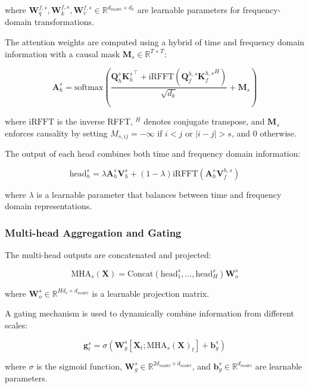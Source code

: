 where $\mathbf{W}_q^{f,s}, \mathbf{W}_k^{f,s}, \mathbf{W}_v^{f,s} \in \mathbb{R}^{d_{model} \times d_k}$ are learnable parameters for frequency-domain transformations.

The attention weights are computed using a hybrid of time and frequency domain information with a causal mask $\mathbf{M}_s \in \mathbb{R}^{T \times T}$:

\begin{equation}
    \mathbf{A}_h^s = \text{softmax}\left(\frac{\mathbf{Q}_h^s{\mathbf{K}_h^s}^\top + \text{iRFFT}(\mathbf{Q}_f^{h,s}{\mathbf{K}_f^{h,s}}^H)}{\sqrt{d_k}} + \mathbf{M}_s\right)
\end{equation}

where $\text{iRFFT}$ is the inverse RFFT, $^H$ denotes conjugate transpose, and $\mathbf{M}_s$ enforces causality by setting $M_{s,ij} = -\infty$ if $i < j$ or $|i-j| > s$, and 0 otherwise.

The output of each head combines both time and frequency domain information:

\begin{equation}
    \text{head}_h^s = \lambda \mathbf{A}_h^s\mathbf{V}_h^s + (1-\lambda)\text{iRFFT}(\mathbf{A}_h^s\mathbf{V}_f^{h,s})
\end{equation}

where $\lambda$ is a learnable parameter that balances between time and frequency domain representations.

\subsubsection{Multi-head Aggregation and Gating}
The multi-head outputs are concatenated and projected:

\begin{equation}
    \text{MHA}_s(\mathbf{X}) = \text{Concat}(\text{head}_1^s, ..., \text{head}_H^s)\mathbf{W}_o^s
\end{equation}

where $\mathbf{W}_o^s \in \mathbb{R}^{Hd_v \times d_{model}}$ is a learnable projection matrix.

A gating mechanism is used to dynamically combine information from different scales:

\begin{equation}
    \mathbf{g}_t^s = \sigma(\mathbf{W}_g^s[\mathbf{X}_t; \text{MHA}_s(\mathbf{X})_t] + \mathbf{b}_g^s)
\end{equation}

where $\sigma$ is the sigmoid function, $\mathbf{W}_g^s \in \mathbb{R}^{2d_{model} \times d_{model}}$, and $\mathbf{b}_g^s \in \mathbb{R}^{d_{model}}$ are learnable parameters.

